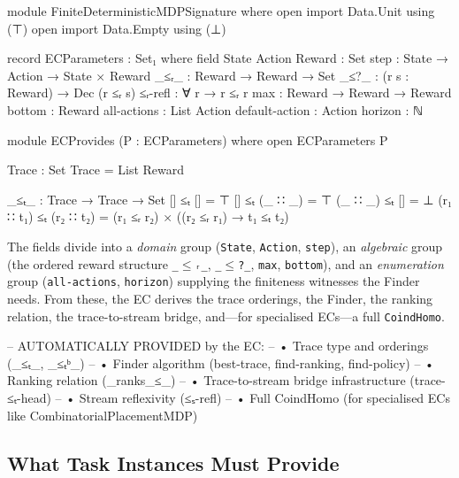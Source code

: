 \documentclass[runningheads]{llncs}
\begin{document}
\begin{code}[hide]
module FiniteDeterministicMDPSignature where
  open import Data.Unit using (⊤)
  open import Data.Empty using (⊥)
\end{code}

\begin{code}[hide]
  record ECParameters : Set₁ where
    field
      State Action Reward : Set
      step      : State → Action → State × Reward
      _≤ᵣ_      : Reward → Reward → Set
      _≤?_      : (r s : Reward) → Dec (r ≤ᵣ s)
      ≤ᵣ-refl   : ∀ {r} → r ≤ᵣ r
      max       : Reward → Reward → Reward
      bottom    : Reward
      all-actions    : List Action
      default-action : Action
      horizon   : ℕ
\end{code}

\begin{code}[hide]
  module ECProvides (P : ECParameters) where
    open ECParameters P
    
    Trace : Set
    Trace = List Reward
    
    _≤ₜ_ : Trace → Trace → Set
    []       ≤ₜ []       = ⊤
    []       ≤ₜ (_ ∷ _)  = ⊤
    (_ ∷ _)  ≤ₜ []       = ⊥
    (r₁ ∷ t₁) ≤ₜ (r₂ ∷ t₂) = (r₁ ≤ᵣ r₂) × ((r₂ ≤ᵣ r₁) → t₁ ≤ₜ t₂)
\end{code}

\noindent The fields divide into a \emph{domain} group (\texttt{State}, \texttt{Action}, \texttt{step}), an \emph{algebraic} group (the ordered reward structure \texttt{\_$\le$ᵣ\_}, \texttt{\_$\le$?\_}, \texttt{max}, \texttt{bottom}), and an \emph{enumeration} group (\texttt{all-actions}, \texttt{horizon}) supplying the finiteness witnesses the Finder needs.  From these, the EC derives the trace orderings, the Finder, the ranking relation, the trace-to-stream bridge, and---for specialised ECs---a full \texttt{CoindHomo}.

\begin{code}[hide]
  -- AUTOMATICALLY PROVIDED by the EC:
  -- • Trace type and orderings (_≤ₜ_, _≤ₜᵇ_)
  -- • Finder algorithm (best-trace, find-ranking, find-policy)
  -- • Ranking relation (_ranks_≤_)
  -- • Trace-to-stream bridge infrastructure (trace-≤ₜ-head)
  -- • Stream reflexivity (≤ₛ-refl)
  -- • Full CoindHomo (for specialised ECs like CombinatorialPlacementMDP)
\end{code}

\subsection{What Task Instances Must Provide}\label{sec:task-provide}
\end{document}
